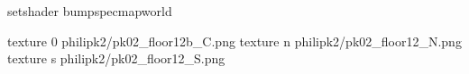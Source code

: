setshader bumpspecmapworld

texture 0 philipk2/pk02_floor12b_C.png
texture n philipk2/pk02_floor12_N.png
texture s philipk2/pk02_floor12_S.png

